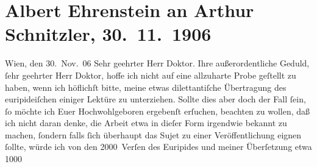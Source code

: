 

         
         \newcommand{\erwaehntePersonen}{Personen:  Euripides}
         \newcommand{\erwaehnteInstitutionen}{}
         \newcommand{\erwaehnteOrte}{Orte: Wien}
         \newcommand{\erwaehnteWerke}{Werke: Helena}
               \section[Albert Ehrenstein an Arthur Schnitzler, 30. 11. 1906]{ Albert Ehrenstein an Arthur Schnitzler, 30. 11. 1906}\nopagebreak{}\rehead{ }\begin{ledgroupsized}[t]{13cm}\normalsize\beginnumbering \toendnotes[C]{\smallbreak\pagebreak[2]} 
\toendnotes[C]{\smallbreak}\pstart
           \raggedleft{}{\pb}Wien, den 30. Nov. 06\pend
           \pstart{}Sehr geehrter Herr Doktor.\pend\pstart
           Ihre außerordentliche Geduld, ſehr geehrter Herr Doktor, hoffe ich nicht auf eine
                    allzuharte Probe geſtellt zu haben, wenn ich höflichſt bitte, meine etwas
                    dilettantiſche Übertragung des euripideiſchen\label{K_L01640_1v}\label{K_L01640_1h} einiger Lektüre zu
                    unterziehen. Sollte dies aber doch der Fall ſein, ſo möchte ich Euer
                    Hochwohlgeboren ergebenſt erſuchen, beachten zu wollen, daß ich nicht daran
                    denke, die Arbeit etwa in dieſer Form {\pb}irgendwie bekannt zu machen, ſondern falls ſich überhaupt das Sujet zu einer
                    Veröffentlichung eignen ſollte, würde ich von den 2000 Verſen des Euripides und meiner Überſetzung etwa 1000

\end{ledgroupsized}
